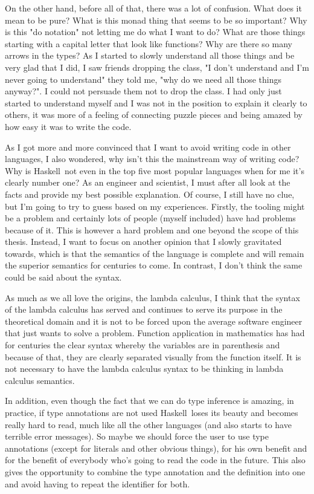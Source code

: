 \documentclass[diploma]{softlab-thesis}
\def\H{Haskell}
\begin{document}
On the other hand, before all of that, there was a lot of confusion. What does
it mean to be pure? What is this monad thing that seems to be so important?
Why is this "do notation" not letting me do what I want to do? What are those
things starting with a capital letter that look like functions? Why are there
so many arrows in the types? As I started to slowly understand all those things
and be very glad that I did, I saw friends dropping the class, "I don't
understand and I'm never going to understand" they told me, "why do we need all
those things anyway?". I could not persuade them not to drop the class. I had
only just started to understand myself and I was not in the position to explain
it clearly to others, it was more of a feeling of connecting puzzle pieces and
being amazed by how easy it was to write the code.

As I got more and more convinced that I want to avoid writing code in other
languages, I also wondered, why isn't this the mainstream way of writing code?
Why is \H\ not even in the top five most popular languages when for me it's
clearly number one? As an engineer and scientist, I must after all look at the
facts and provide my best possible explanation. Of course, I still have no
clue, but I'm going to try to guess based on my experiences.  Firstly, the
tooling might be a problem and certainly lots of people (myself included) have
had problems because of it. This is however a hard problem and one beyond the
scope of this thesis.  Instead, I want to focus on another opinion that I
slowly gravitated towards, which is that the semantics of the language is
complete and will remain the superior semantics for centuries to come.  In
contrast, I don't think the same could be said about the syntax.

As much as we all love the origins, the lambda
calculus, I think that the syntax of the lambda calculus has served and
continues to serve its purpose in the theoretical domain and it is not to be
forced upon the average software engineer that just wants to solve a problem.
Function application in mathematics has had for centuries the clear syntax
whereby the variables are in parenthesis and because of that, they are clearly
separated visually from the function itself. It is not necessary to have the
lambda calculus syntax to be thinking in lambda calculus semantics.

In addition, even though the fact that we can do type inference is amazing, in
practice, if type annotations are not used \H\ loses its beauty and
becomes really hard to read, much like all the other languages (and also starts
to have terrible error messages).  So maybe we should force the user to use
type annotations (except for literals and other obvious things), for his own
benefit and for the benefit of everybody who's going to read the code in the
future.  This also gives the opportunity to combine the type annotation and the
definition into one and avoid having to repeat the identifier for both.
\end{document}
